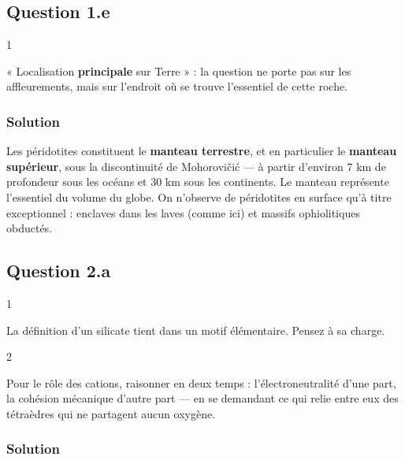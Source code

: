 \documentclass[11pt,a4paper]{article}
\begin{document}
\hypertarget{question-1.e}{%
\subsection{Question 1.e}\label{question-1.e}}

\begin{indication}{1}

« Localisation \textbf{principale} sur Terre » : la question ne porte pas sur les affleurements, mais sur l'endroit où se trouve l'essentiel de cette roche.

\end{indication}

\hypertarget{solution-4}{%
\subsubsection{Solution}\label{solution-4}}

Les péridotites constituent le \textbf{manteau terrestre}, et en particulier le \textbf{manteau supérieur}, sous la discontinuité de Mohorovičić --- à partir d'environ 7 km de profondeur sous les océans et 30 km sous les continents. Le manteau représente l'essentiel du volume du globe. On n'observe de péridotites en surface qu'à titre exceptionnel : enclaves dans les laves (comme ici) et massifs ophiolitiques obductés.

\hypertarget{question-2.a}{%
\subsection{Question 2.a}\label{question-2.a}}

\begin{indication}{1}

La définition d'un silicate tient dans un motif élémentaire. Pensez à sa charge.

\end{indication}

\begin{indication}{2}

Pour le rôle des cations, raisonner en deux temps : l'électroneutralité d'une part, la cohésion mécanique d'autre part --- en se demandant ce qui relie entre eux des tétraèdres qui ne partagent aucun oxygène.

\end{indication}

\hypertarget{solution-5}{%
\subsubsection{Solution}\label{solution-5}}
\end{document}
